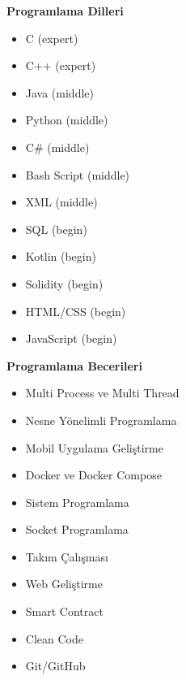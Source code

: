 \documentclass[a4paper,11pt]{article}
\begin{document}
\noindent
\begin{minipage}[t]{0.48\textwidth}
    \textbf{Programlama Dilleri}
    \vspace{0.5em}
    \begin{itemize}[leftmargin=2em]
        \item C (expert)
        \item C++ (expert)
        \item Java (middle)
        \item Python (middle)
        \item C\# (middle)
        \item Bash Script (middle)
        \item XML (middle)
        \item SQL (begin)
        \item Kotlin (begin)
        \item Solidity (begin)
		\item HTML/CSS (begin)
		\item JavaScript (begin)
    \end{itemize}
\end{minipage}%
\hfill
\begin{minipage}[t]{0.48\textwidth}
    \textbf{Programlama Becerileri}
    \vspace{0.5em}
    \begin{itemize}[leftmargin=2em]
        \item Multi Process ve Multi Thread
        \item Nesne Yönelimli Programlama
        \item Mobil Uygulama Geliştirme
        \item Docker ve Docker Compose
		\item Sistem Programlama
        \item Socket Programlama
		\item Takım Çalışması
		\item Web Geliştirme
		\item Smart Contract
        \item Clean Code
        \item Git/GitHub	
    \end{itemize}
\end{minipage}
\end{document}
